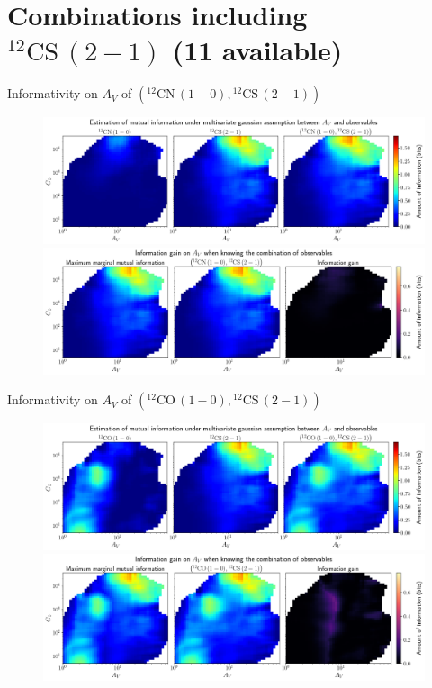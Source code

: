 \documentclass{beamer}
\begin{document}
\section{Combinations including $\mathrm{^{12}CS\,(2-1)}$ (11 available)}

\begin{frame}{Informativity on $A_V$ of $\left(\mathrm{^{12}CN\,(1-0)},\mathrm{^{12}CS\,(2-1)}\right)$}
    \begin{figure}
        \centering
        \includegraphics[width=0.95\linewidth]{../linearinfo/av__12cn10_12cs21_linearinfo.png}
        \vfill
        \includegraphics[width=0.95\linewidth]{../linearinfo/av__12cn10_12cs21_linearinfo_gain.png}
    \end{figure}
\end{frame}

\begin{frame}{Informativity on $A_V$ of $\left(\mathrm{^{12}CO\,(1-0)},\mathrm{^{12}CS\,(2-1)}\right)$}
    \begin{figure}
        \centering
        \includegraphics[width=0.95\linewidth]{../linearinfo/av__12co10_12cs21_linearinfo.png}
        \vfill
        \includegraphics[width=0.95\linewidth]{../linearinfo/av__12co10_12cs21_linearinfo_gain.png}
    \end{figure}
\end{frame}
\end{document}
